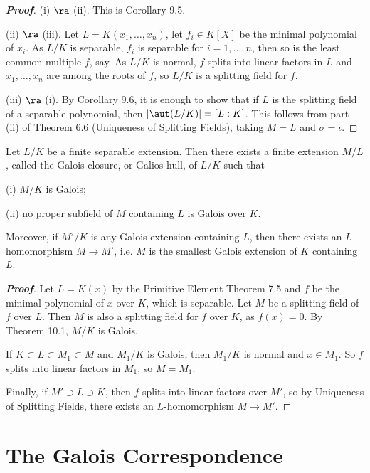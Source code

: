 \begin{proof}[\bf Proof]
(i) $\ra$ (ii). This is Corollary 9.5.

(ii) $\ra$ (iii). Let $L = K(x_1, \dots , x_n)$, let $f_i \in K[X]$ be the minimal polynomial of $x_i$. As $L/K$ is separable, $f_i$ is separable for $i = 1, \dots ,n$, then so is the least common multiple $f$, say. As $L/K$ is normal, $f$ splits into linear factors in $L$ and $x_1, \dots , x_n$ are among the roots of $f$, so $L/K$ is a splitting field for $f$.

(iii) $\ra$ (i). By Corollary 9.6, it is enough to show that if $L$ is the splitting field of a separable polynomial, then $|\aut(L/K)| = [L : K]$. This follows from part (ii) of Theorem 6.6 (Uniqueness of Splitting Fields), taking $M = L$ and $\sigma = \iota$.
\end{proof}

\begin{theorem}
Let $L/K$ be a finite separable extension. Then there exists a finite extension $M/L$, called the Galois closure, or Galios hull, of $L/K$ such that
\ben
\item [(i)] $M/K$ is Galois;
\item [(ii)] no proper subfield of $M$ containing $L$ is Galois over $K$.
\een

Moreover, if $M'/K$ is any Galois extension containing $L$, then there exists an $L$-homomorphism $M \to M'$, i.e. $M$ is the smallest Galois extension of $K$ containing $L$.
\end{theorem}

\begin{proof}[\bf Proof]
Let $L = K(x)$ by the Primitive Element Theorem 7.5 and $f$ be the minimal polynomial of $x$ over $K$, which is separable. Let $M$ be a splitting field of $f$ over $L$. Then $M$ is also a splitting field for $f$ over $K$, as $f(x) = 0$. By Theorem 10.1, $M/K$ is Galois.

If $K \subset L \subset M_1 \subset M$ and $M_1/K$ is Galois, then $M_1/K$ is normal and $x \in M_1$. So $f$ splits into linear factors in $M_1$, so $M = M_1$.

Finally, if $M' \supset L \supset K$, then $f$ splits into linear factors over $M'$, so by Uniqueness of Splitting Fields, there exists an $L$-homomorphism $M \to M'$.
\end{proof}


\section{The Galois Correspondence}

